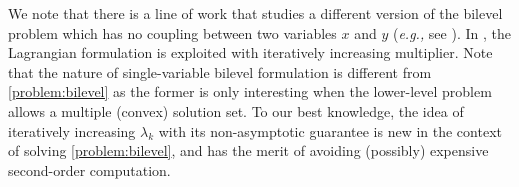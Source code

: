 We note that there is a line of work that studies a different version of the bilevel problem which has no coupling between two variables $x$ and $y$ ({\it e.g.,} see \cite{ferris1991finite, solodov2007explicit, jiang2022conditional}). In \cite{amini2019iterative, amini2019iterative2}, the Lagrangian formulation is exploited with iteratively increasing multiplier. Note that the nature of single-variable bilevel formulation is different from \eqref{problem:bilevel} as the former is only interesting when the lower-level problem allows a multiple (convex) solution set. To our best knowledge, the idea of iteratively increasing $\lambda_k$ with its non-asymptotic guarantee is new in the context of solving \eqref{problem:bilevel}, and has the merit of avoiding (possibly) expensive second-order computation. 


